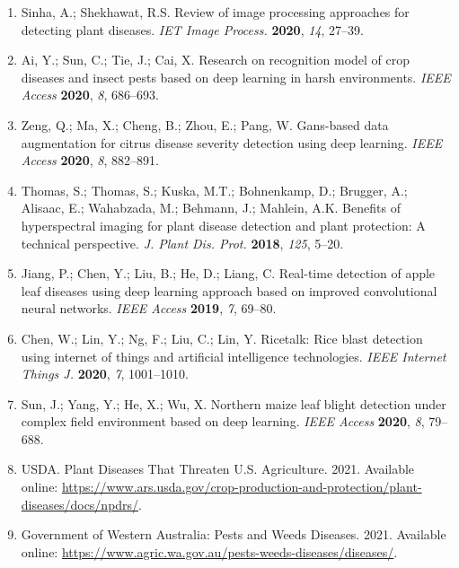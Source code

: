 \documentclass{article}
\begin{document}
\begin{enumerate}
    \item Sinha, A.; Shekhawat, R.S. Review of image processing approaches for detecting plant diseases. \textit{IET Image Process.} \textbf{2020}, \textit{14}, 27–39.
    
    \item Ai, Y.; Sun, C.; Tie, J.; Cai, X. Research on recognition model of crop diseases and insect pests based on deep learning in harsh environments. \textit{IEEE Access} \textbf{2020}, \textit{8}, 686–693.
    
    \item Zeng, Q.; Ma, X.; Cheng, B.; Zhou, E.; Pang, W. Gans-based data augmentation for citrus disease severity detection using deep learning. \textit{IEEE Access} \textbf{2020}, \textit{8}, 882–891.
    
    \item Thomas, S.; Thomas, S.; Kuska, M.T.; Bohnenkamp, D.; Brugger, A.; Alisaac, E.; Wahabzada, M.; Behmann, J.; Mahlein, A.K. Benefits of hyperspectral imaging for plant disease detection and plant protection: A technical perspective. \textit{J. Plant Dis. Prot.} \textbf{2018}, \textit{125}, 5–20.
    
    \item Jiang, P.; Chen, Y.; Liu, B.; He, D.; Liang, C. Real-time detection of apple leaf diseases using deep learning approach based on improved convolutional neural networks. \textit{IEEE Access} \textbf{2019}, \textit{7}, 69–80.
    
    \item Chen, W.; Lin, Y.; Ng, F.; Liu, C.; Lin, Y. Ricetalk: Rice blast detection using internet of things and artificial intelligence technologies. \textit{IEEE Internet Things J.} \textbf{2020}, \textit{7}, 1001–1010.
    
    \item Sun, J.; Yang, Y.; He, X.; Wu, X. Northern maize leaf blight detection under complex field environment based on deep learning. \textit{IEEE Access} \textbf{2020}, \textit{8}, 79–688.
    
    \item USDA. Plant Diseases That Threaten U.S. Agriculture. 2021. Available online: \url{https://www.ars.usda.gov/crop-production-and-protection/plant-diseases/docs/npdrs/}.
    
    \item Government of Western Australia: Pests and Weeds Diseases. 2021. Available online: \url{https://www.agric.wa.gov.au/pests-weeds-diseases/diseases/}.
    

\end{enumerate}
\end{document}
